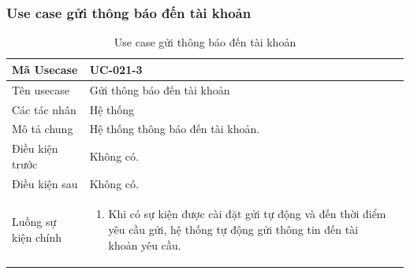 \documentclass[12pt,a4paper]{article}
\begin{document}
    \subsubsection*{Use case gửi thông báo đến tài khoản}
    \begin{table}[H]
        \centering
        \begin{tabular}{|p{3.5cm}|p{11.5cm}|c|}
            \hline
            Mã Usecase      & UC-021-3                          \\
            \hline
            Tên usecase     & Gửi thông báo đến tài khoản       \\
            \hline
            Các tác nhân    & Hệ thống                          \\
            \hline
            Mô tả chung     & Hệ thống thông báo đến tài khoản. \\
            \hline

            Điều kiện trước & Không có.                         \\
            \hline

            Điều kiện sau   & Không có.                         \\
            \hline

            Luồng sự kiện chính & \vspace{-.8cm}\begin{enumerate}
                                                    \item Khi có sự kiện được cài đặt gửi tự động và đến thời điểm yêu cầu gửi, hệ thống tự động gửi thông tin đến tài khoản yêu cầu.
            \end{enumerate}
            \\
            \hline
        \end{tabular}
        \caption{Use case gửi thông báo đến tài khoản}

    \end{table}


\end{document}
